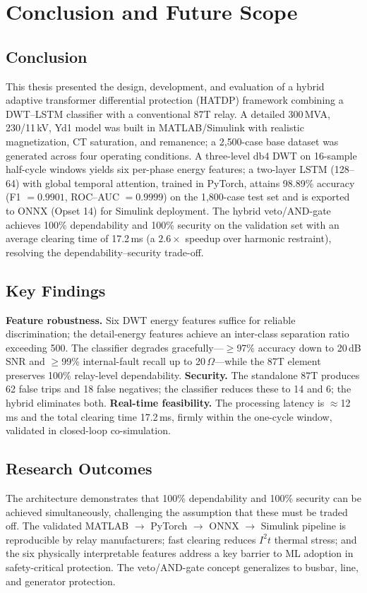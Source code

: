 \documentclass[12pt,a4paper,oneside]{report}
\begin{document}
\chapter{Conclusion and Future Scope}
\section{Conclusion}
This thesis presented the design, development, and evaluation of a hybrid adaptive transformer differential protection (HATDP) framework combining a DWT--LSTM classifier with a conventional 87T relay. A detailed 300\,MVA, 230/11\,kV, Yd1 model was built in MATLAB/Simulink with realistic magnetization, CT saturation, and remanence; a 2{,}500-case base dataset was generated across four operating conditions. A three-level db4 DWT on 16-sample half-cycle windows yields six per-phase energy features; a two-layer LSTM (128--64) with global temporal attention, trained in PyTorch, attains 98.89\% accuracy (F1 $=0.9901$, ROC--AUC $=0.9999$) on the 1{,}800-case test set and is exported to ONNX (Opset 14) for Simulink deployment. The hybrid veto/AND-gate achieves 100\% dependability and 100\% security on the validation set with an average clearing time of 17.2\,ms (a $2.6\times$ speedup over harmonic restraint), resolving the dependability--security trade-off.

\section{Key Findings}
\textbf{Feature robustness.} Six DWT energy features suffice for reliable discrimination; the detail-energy features achieve an inter-class separation ratio exceeding 500. The classifier degrades gracefully---$\ge$97\% accuracy down to 20\,dB SNR and $\ge$99\% internal-fault recall up to 20\,$\Omega$---while the 87T element preserves 100\% relay-level dependability. \textbf{Security.} The standalone 87T produces 62 false trips and 18 false negatives; the classifier reduces these to 14 and 6; the hybrid eliminates both. \textbf{Real-time feasibility.} The processing latency is $\approx$12\,ms and the total clearing time 17.2\,ms, firmly within the one-cycle window, validated in closed-loop co-simulation.

\section{Research Outcomes}
The architecture demonstrates that 100\% dependability and 100\% security can be achieved simultaneously, challenging the assumption that these must be traded off. The validated MATLAB $\to$ PyTorch $\to$ ONNX $\to$ Simulink pipeline is reproducible by relay manufacturers; fast clearing reduces $I^2t$ thermal stress; and the six physically interpretable features address a key barrier to ML adoption in safety-critical protection. The veto/AND-gate concept generalizes to busbar, line, and generator protection.
\end{document}
